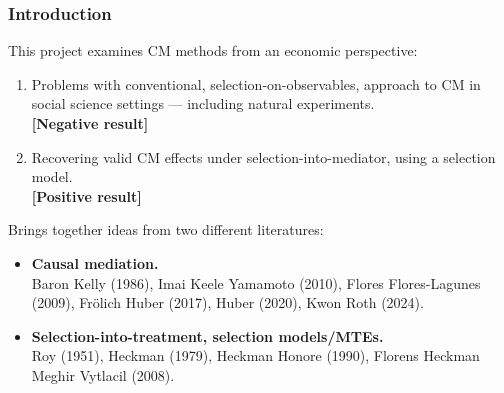 \documentclass[dvipsnames,handout]{beamer} %
\begin{document}
\begin{frame}[noframenumbering]
    \frametitle{Introduction}
    This project examines CM methods from an economic perspective:
    \begin{enumerate}
        \item Problems with conventional, selection-on-observables, approach to CM in social science settings --- including natural experiments.
        \\ \textbf{[Negative result]}
        \item Recovering valid CM effects under selection-into-mediator, using a selection model.
        \\ \textbf{[Positive result]}
    \end{enumerate}
    \vspace{0.25cm}
    Brings together ideas from two different literatures:
    \begin{itemize}
        \item \textbf{Causal mediation.}
        \\ Baron Kelly (1986), Imai Keele Yamamoto (2010), Flores Flores-Lagunes (2009), Fr\"olich Huber (2017), Huber (2020), Kwon Roth (2024).
        \item \textbf{Selection-into-treatment, selection models/MTEs.}
        \\ Roy (1951), Heckman (1979), Heckman Honore (1990), Florens Heckman Meghir Vytlacil (2008).
    \end{itemize}
\end{frame}%
\end{document}
